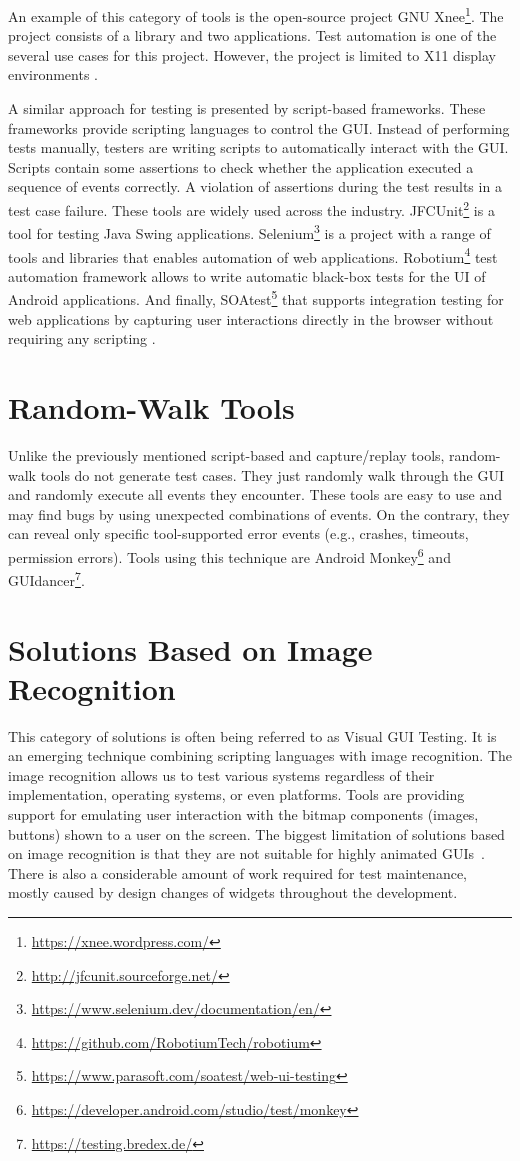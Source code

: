 An example of this category of tools is the open-source project GNU Xnee\footnote{\url{https://xnee.wordpress.com/}}. The project consists of a library and two applications. Test automation is one of the several use cases for this project. However, the project is limited to X11 display environments \cite{xnee}.

A similar approach for testing is presented by script-based frameworks. These frameworks provide scripting languages to control the GUI. Instead of performing tests manually, testers are writing scripts to automatically interact with the GUI. Scripts contain some assertions to check whether the application executed a sequence of events correctly. A violation of assertions during the test results in a test case failure. These tools are widely used across the industry. 
JFCUnit\footnote{\url{http://jfcunit.sourceforge.net/}} is a tool for testing Java Swing applications. 
Selenium\footnote{\url{https://www.selenium.dev/documentation/en/}} is a project with a range of tools and libraries that enables automation of web applications. Robotium\footnote{\url{https://github.com/RobotiumTech/robotium}} test automation framework allows to write automatic black-box tests for the UI of Android applications. And finally, SOAtest\footnote{\url{https://www.parasoft.com/soatest/web-ui-testing}} that supports integration testing for web applications by capturing user interactions directly in the browser without requiring any scripting \cite{NguyenBao2014Gait}.

\section{Random-Walk Tools}
Unlike the previously mentioned script-based and capture/replay tools, random-walk tools do not generate test cases. They just randomly walk through the GUI and randomly execute all events they encounter. These tools are easy to use and may find bugs by using unexpected combinations of events. On the contrary, they can reveal only specific tool-supported error events (e.g., crashes, timeouts, permission errors). Tools using this technique are Android Monkey\footnote{\url{https://developer.android.com/studio/test/monkey}} and GUIdancer\footnote{\url{https://testing.bredex.de/}}.

\section{Solutions Based on Image Recognition}
This category of solutions is often being referred to as Visual GUI Testing. It is an emerging technique combining scripting languages with image recognition. The image recognition allows us to test various systems regardless of their implementation, operating systems, or even platforms. Tools are providing support for emulating user interaction with the bitmap components (images, buttons) shown to a user on the screen. The biggest limitation of solutions based on image recognition is that they are not suitable for highly animated GUIs~\cite{guitesting}. There is also a considerable amount of work required for test maintenance, mostly caused by design changes of widgets throughout the development.   

